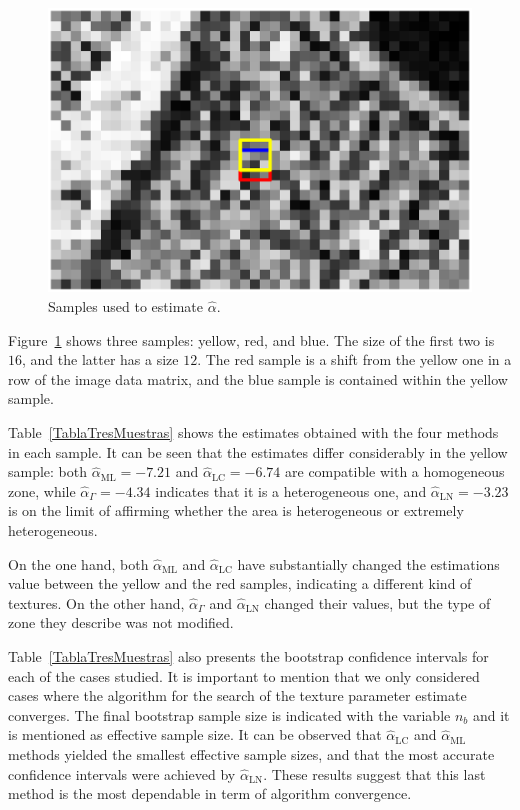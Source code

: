 \documentclass[twocolumn]{svjour3}
\begin{document}
\begin{figure}[hbt]
\centering
\includegraphics[width=0.9\linewidth]{../Figures/TresMuestrasAgrandada}
\caption{Samples used to estimate $\widehat{\alpha}$.}\label{TresMuestras} 
\end{figure}

Figure~\ref{TresMuestras} shows three samples: yellow, red, and blue. 
The size of the first two is $16$, and the latter has a size $12$. 
The red sample is a shift from the yellow one in a row of the image data matrix, and the blue sample is contained within the yellow sample.

Table~\ref{TablaTresMuestras} shows the estimates obtained with the four methods in each sample. 
It can be seen that the estimates differ considerably in the yellow sample: 
both $\widehat{\alpha}_{\text{{ML}}}=-7.21$ and $\widehat{\alpha}_{\text{{LC}}}=-6.74$ are compatible with a homogeneous zone, while $\widehat{\alpha}_{\Gamma}=-4.34$ indicates that it is a heterogeneous one, and $\widehat{\alpha}_{\text{{LN}}}=-3.23$ is on the limit of affirming whether the area is heterogeneous or extremely heterogeneous.

On the one hand, both $\widehat{\alpha}_{\text{{ML}}}$ and $\widehat{\alpha}_{\text{{LC}}}$ have substantially changed the estimations value between the yellow and the red samples, indicating a different kind of textures. 
On the other hand, $\widehat{\alpha}_{\Gamma}$ and $\widehat{\alpha}_{\text{{LN}}}$ changed their values, but the type of zone they describe was not modified.

Table~\ref{TablaTresMuestras} also presents the bootstrap confidence intervals for each of the cases studied. 
It is important to mention that we only considered cases where the algorithm for the search of the texture parameter estimate converges. 
The final bootstrap sample size is indicated with the variable $n_b$ and it is mentioned as effective sample size.  
It can be observed that $\widehat{\alpha}_{\text{{LC}}}$ and $\widehat{\alpha}_{\text{{ML}}}$ methods yielded the smallest effective sample sizes, and that the most accurate confidence intervals were achieved by $\widehat{\alpha}_{\text{{LN}}}$.
These results suggest that this last method is the most dependable in term of algorithm convergence. 
\end{document}
